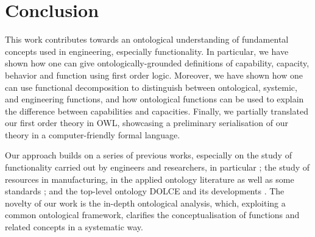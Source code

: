 \documentclass[sw]{iosart2x}
\newcommand{\DOLCE}{\textsc{DOLCE}\xspace} %
\newcommand{\OWL}{\textnormal{OWL}\xspace}
\begin{document}
\section{Conclusion}\label{sec:conc}
This work contributes towards an ontological understanding of fundamental concepts used in engineering, especially functionality.
In particular, we have shown how one can give ontologically-grounded definitions of capability, capacity, behavior and function using first order logic.
Moreover, we have shown how one can use functional decomposition to distinguish between ontological, systemic, and engineering functions, and how ontological functions can be used to explain the difference between capabilities and capacities.
Finally, we partially translated our first order theory in \OWL, showcasing a preliminary serialisation of our theory in a computer-friendly formal language.

Our approach builds on a series of previous works, especially on the study of functionality carried out by engineers and researchers, in particular \cite{pahl_engineering_2007, sasajimaFBRLFunctionBehavior1995, mizoguchiUnifiedDefinitionFunction2012}; the study of resources in manufacturing, in the applied ontology literature as well as some standards  \cite{sanfilippoResourcesManufacturing2015, borgoCapabilitiesCapacitiesFunctionalities2021, jochemISOISO15531312004}; and the top-level ontology \DOLCE and its developments \cite{masoloSocialRolesTheir2004, masoloWonderWebDeliverableD182003}.
The novelty of our work is the in-depth ontological analysis, which,  exploiting a common ontological framework, clarifies the conceptualisation of functions and related concepts in a systematic way.

\end{document}

